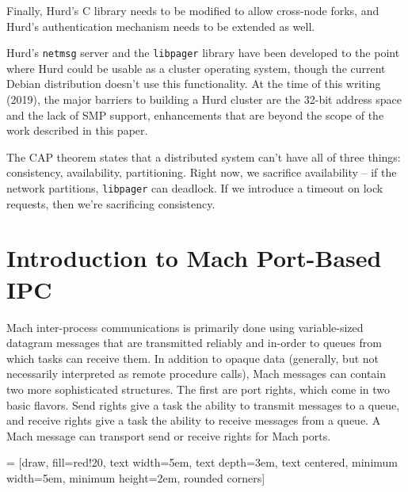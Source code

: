 \documentclass{article}
\def\libpager{{\tt libpager}\xspace}
\def\netmsg{{\tt netmsg}\xspace}
\begin{document}
Finally, Hurd's C library needs to be modified to allow cross-node
forks, and Hurd's authentication mechanism needs to be extended
as well.

Hurd's \netmsg server and the \libpager library have been developed
to the point where Hurd could be usable as a cluster operating system,
though the current Debian distribution doesn't use this functionality.
At the time of this writing (2019), the major barriers to building a
Hurd cluster are the 32-bit address space and the lack of SMP support,
enhancements that are beyond the scope of the work described in this
paper.

The CAP theorem states that a distributed system can't have all of
three things: consistency, availability, partitioning.  Right now, we
sacrifice availability -- if the network partitions, \libpager can
deadlock.  If we introduce a timeout on lock requests, then we're
sacrificing consistency.


\section{Introduction to Mach Port-Based IPC}

Mach inter-process communications is primarily done using
variable-sized datagram messages that are transmitted reliably and
in-order to queues from which tasks can receive them.  In addition to
opaque data (generally, but not necessarily interpreted as remote
procedure calls), Mach messages can contain two more sophisticated
structures.  The first are port rights, which come in two basic
flavors.  Send rights give a task the ability to transmit messages to
a queue, and receive rights give a task the ability to receive
messages from a queue.  A Mach message can transport send or receive
rights for Mach ports.

 = [draw, fill=red!20, text width=5em, text depth=3em, text centered,
  minimum width=5em, minimum height=2em, rounded corners]
\end{document}
